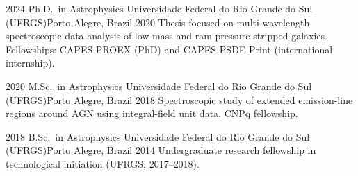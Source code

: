 
\begin{experiences}

  \experience
    {2024} {Ph.D.\ in Astrophysics}
           {Universidade Federal do Rio Grande do Sul (UFRGS)}{Porto Alegre, Brazil}
    {2020} {
      Thesis focused on multi-wavelength spectroscopic data analysis of
      low-mass and ram-pressure-stripped galaxies.
      Fellowships: CAPES PROEX (PhD) and CAPES PSDE-Print (international internship).
    }{}

  \emptySeparator

  \experience
    {2020} {M.Sc.\ in Astrophysics}
           {Universidade Federal do Rio Grande do Sul (UFRGS)}{Porto Alegre, Brazil}
    {2018} {
      Spectroscopic study of extended emission-line regions around AGN using
      integral-field unit data. CNPq fellowship.
    }{}

  \emptySeparator

  \experience
    {2018} {B.Sc.\ in Astrophysics}
           {Universidade Federal do Rio Grande do Sul (UFRGS)}{Porto Alegre, Brazil}
    {2014} {
      Undergraduate research fellowship in technological initiation (UFRGS, 2017--2018).
    }{}

\end{experiences}
